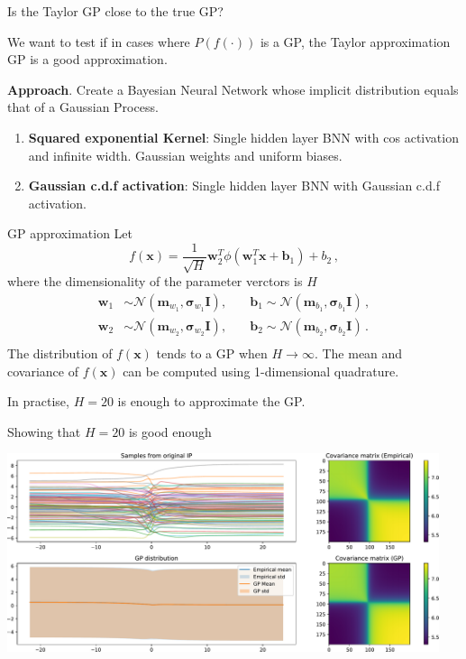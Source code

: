     \begin{frame}{Is the Taylor GP close to the true GP?}

        We want to test if in cases where \(P(f(\cdot))\) is a GP, the Taylor approximation GP is a good approximation. 

        \textbf{Approach}. Create a Bayesian Neural Network whose implicit distribution equals that of a Gaussian Process.

        \begin{enumerate}
            \item \textbf{Squared exponential Kernel}: Single hidden layer BNN with cos activation and infinite width. Gaussian weights and uniform biases.
            \item \textbf{Gaussian c.d.f activation}: Single hidden layer BNN with Gaussian c.d.f activation.
        \end{enumerate}
    \end{frame}

    \begin{frame}{GP approximation}
        Let 
        \[
            f(\mathbf x) = \frac{1}{\sqrt{H}}\bm w_2^T \phi(\bm w_1^T \mathbf x + \bm b_1) + b_2\,,
        \]
        where the dimensionality of the parameter verctors is \(H\)
        \[
            \begin{aligned}
            \bm w_1 &\sim \mathcal{N}(\bm m_{w_1}, \bm \sigma_{w_1} \bm I),\quad &\bm b_1 \sim \mathcal{N}(\bm m_{b_1}, \bm \sigma_{b_1} \bm I)\,,\\
            \bm w_2 &\sim \mathcal{N}(\bm m_{w_2}, \bm \sigma_{w_2} \bm I),\quad &\bm b_2 \sim \mathcal{N}(\bm m_{b_2}, \bm \sigma_{b_2} \bm I)\,.\\
            \end{aligned}
        \]
        The distribution of \(f(\mathbf x)\) tends to a GP when \(H \to \infty\). The mean and covariance of \(f(\mathbf x)\) can be computed using 1-dimensional quadrature.

        In practise, \(H = 20\) is enough to approximate the GP. 
    \end{frame}

    \begin{frame}{Showing that \(H = 20\) is good enough}
        \begin{center}
            \includegraphics[width=0.95\textwidth]{imgs/GP_cov.pdf}
        \end{center}
    \end{frame}

